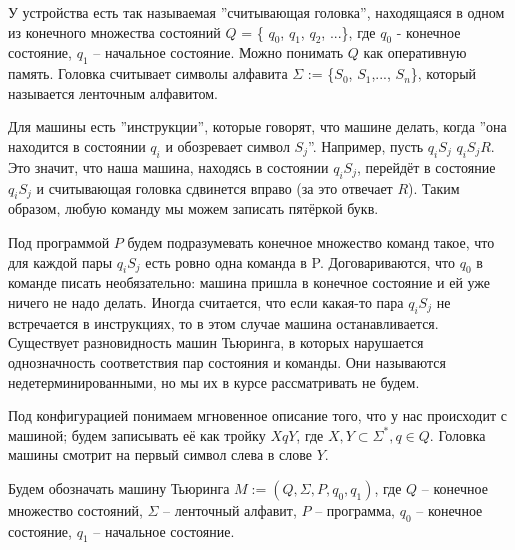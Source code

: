 \par У устройства есть так называемая ''считывающая головка'',  находящаяся в одном из конечного множества состояний $Q$ = \{ $q_{0}$, $q_{1}$, $q_{2}$, ...\}, где $q_{0}$ - конечное состояние, $q_{1}$ -- начальное состояние. Можно понимать $Q$ как оперативную память. Головка считывает символы алфавита $\Sigma$ := \{$S_{0}$, $S_{1}$,..., $S_{n}$\}, который называется ленточным алфавитом. 
\par Для машины есть ''инструкции'', которые говорят, что машине делать, когда ''она находится в состоянии $q_{i}$ и обозревает символ $S_{j}$''. Например, пусть $q_{i}S_{j}$ \to $q_{i}S_{j}R$. Это значит, что наша машина, находясь в состоянии $q_{i}S_{j}$, перейдёт в состояние $q_{i}S_{j}$ и считывающая головка сдвинется вправо (за это отвечает $R$). Таким образом, любую команду мы можем записать пятёркой букв. 
\par Под программой $P$ будем подразумевать конечное множество команд такое, что для каждой пары $q_{i}S_{j}$ есть ровно одна команда в P. Договариваются, что $q_{0}$ в команде писать необязательно: машина пришла в конечное состояние и ей уже ничего не надо делать. Иногда считается, что если какая-то пара $q_{i}S_{j}$ не встречается в инструкциях, то в этом случае машина останавливается. Существует  разновидность машин Тьюринга, в которых нарушается однозначность соответствия пар состояния и команды. Они называются недетерминированными, но мы их в курсе рассматривать не будем.
\par Под конфигурацией понимаем мгновенное описание того, что у нас происходит с машиной; будем записывать её как тройку $XqY$, где $X, Y \subset \Sigma^*, q \in Q$. Головка машины смотрит на первый символ слева в слове $Y$.
\par Будем обозначать машину Тьюринга $M:=(Q, \Sigma, P, q_{0}, q_{1})$, где $Q$ -- конечное множество состояний, $\Sigma$ -- ленточный алфавит, $P$ -- программа, $q_{0}$ -- конечное состояние, $q_{1}$ -- начальное состояние.
